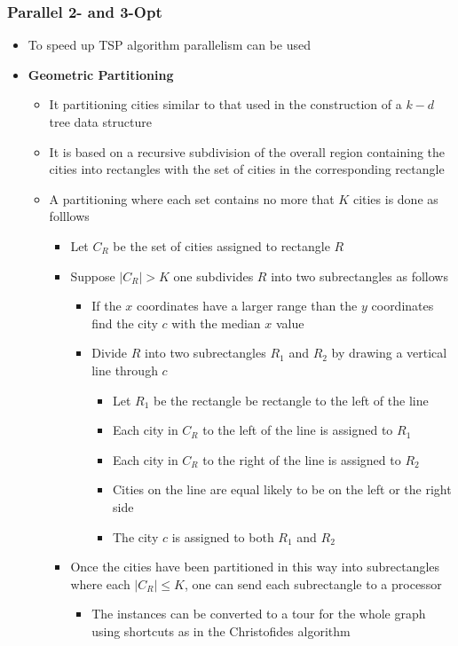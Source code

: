 \documentclass[11pt]{article}
\begin{document}
\subsubsection{Parallel 2- and 3-Opt}
\label{sec:org4054c8b}
\begin{itemize}
\item To speed up TSP algorithm parallelism can be used

\item \textbf{Geometric Partitioning}
\begin{itemize}
\item It partitioning cities similar to that used in the construction of a \(k-d\) tree data structure
\item It is based on a recursive subdivision of the overall region containing the cities into rectangles with the set of cities in the corresponding rectangle
\item A partitioning where each set contains no more that \(K\) cities is done as folllows
\begin{itemize}
\item Let \(C_R\) be the set of cities assigned to rectangle \(R\)
\item Suppose \(|C_R| > K\) one subdivides \(R\) into two subrectangles as follows
\begin{itemize}
\item If the \(x\) coordinates have a larger range than the \(y\) coordinates find the city \(c\) with the median \(x\) value
\item Divide \(R\) into two subrectangles \(R_1\) and \(R_2\) by drawing a vertical line through \(c\)
\begin{itemize}
\item Let \(R_1\) be the rectangle be rectangle to the left of the line
\item Each city in \(C_R\) to the left of the line is assigned to \(R_1\)
\item Each city in \(C_R\) to the right of the line is assigned to \(R_2\)
\item Cities on the line are equal likely to be on the left or the right side
\item The city \(c\) is assigned to both \(R_1\) and \(R_2\)
\end{itemize}
\end{itemize}
\item Once the cities have been partitioned in this way into subrectangles where each \(|C_R| \leq K\), one can send each subrectangle to a processor
\begin{itemize}
\item The instances can be converted to a tour for the whole graph using shortcuts as in the Christofides algorithm
\end{itemize}
\end{itemize}
\end{itemize}


\end{itemize}
\end{document}

